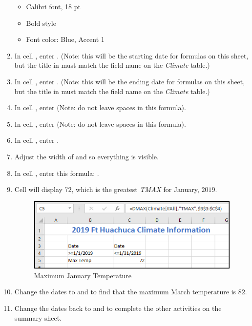 \begin{enumerate}[resume]
		\begin{itemize}
			\item Calibri font, 18 pt
			\item Bold style
			\item Font color: Blue, Accent 1
		\end{itemize}

	\item In cell , enter . (Note: this will be the starting date for formulas on this sheet, but the title in  must match the field name on the \textit{Climate} table.)
	\item In cell , enter . (Note: this will be the ending date for formulas on this sheet, but the title in  must match the field name on the \textit{Climate} table.)
	\item In cell , enter  (Note: do not leave spaces in this formula).
	\item In cell , enter  (Note: do not leave spaces in this formula).
	\item In cell , enter .
	\item Adjust the width of  and  so everything is visible.
	\item In cell , enter this formula: .
	\item Cell  will display $ 72 $, which is the greatest \textit{TMAX} for January, $ 2019 $.

	\begin{figure}[H]
		\centering
		\includegraphics[width=\maxwidth{.95\linewidth}]{gfx/ch09_fig86}
		\caption{Maximum January Temperature}
		\label{09:fig86}
	\end{figure}

	\item Change the dates to  and  to find that the maximum March temperature is $ 82 $.
	\item Change the dates back to  and  to complete the other activities on the summary sheet.


\end{enumerate}
